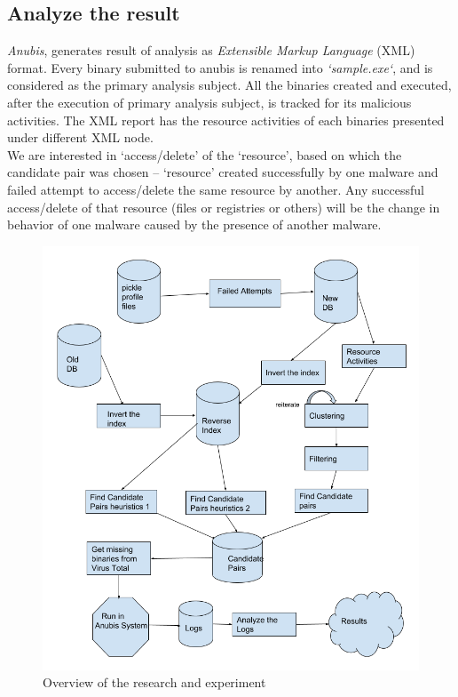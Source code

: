 \subsection{Analyze the result}
\label{sub:Analyze the result}
\emph{Anubis}, generates result of analysis as \emph{Extensible Markup Language} (XML) format.
Every binary submitted to anubis is renamed into \emph{`sample.exe`}, and is considered as the primary analysis subject.
All the binaries created and executed, after the execution of primary analysis subject, is tracked for its malicious activities.
The XML report has the resource activities of each binaries presented under different XML node.\\
We are interested in `access/delete' of the `resource', based on which the candidate pair was chosen -- `resource' created successfully by one malware and failed attempt to access/delete the same resource by another.
Any successful access/delete of that resource (files or registries or others) will be the change in behavior of one malware caused by the presence of another malware.
\begin{figure}[htbp]
  \centering
  \includegraphics[scale=0.5]{figures/bigpicture.png}
  \caption[Big Picture]{Overview of the research and experiment}\label{fig:bigpicture}
\end{figure}
